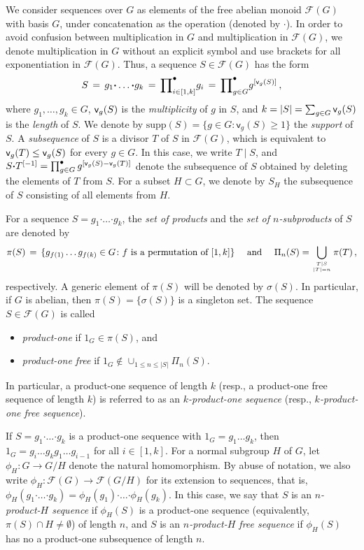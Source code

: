\documentclass[leqno,a4paper]{amsart}
\def\v{{\sf v}}
\def\F{{\mathcal F}}
\def\bd{{\boldsymbol{\cdot}}}
\def\supp{\text{supp}}
\theoremstyle{plain}
\theoremstyle{definition}
\numberwithin{equation}{section}
\begin{document}
	
We  consider sequences over $G$ as elements of the free abelian monoid $\mathcal F (G)$ with basis $G$, under concatenation as the operation (denoted by $\bd$). In order to avoid confusion between multiplication in $G$ and multiplication in $\mathcal F(G)$, we denote multiplication in $G$ without an explicit symbol and  use brackets for all exponentiation in $\mathcal F (G)$.
Thus, a sequence $S \in \F(G)$ has the form
	\[
	  S \, = \, g_1 \bd \ldots \bd g_k \, = \, \small{\prod}^{\bullet}_{i \in [1,k]} g_i \, = \, \small{\prod}^{\bullet}_{g \in G} g^{[\v_g(S)]} \,,
	\]
	where $g_1, \ldots, g_k \in G$, $\v_g(S)$ is the {\em multiplicity} of $g$ in $S$, and $k = |S| = \sum_{g \in G} \v_g(S)$ is the {\em length} of $S$.
    We denote by $\supp (S) = \{ g \in G \colon \mathsf v_g (S) \ge 1 \}$ the {\it support} of $S$.
	A {\em subsequence} of $S$ is a divisor $T$ of $S$ in $\F(G)$, which is equivalent to $\v_g(T) \le \v_g(S)$ for every $g \in G$. In this case, we write $T \mid S$, and $S \bd T^{[-1]} = \prod^{\bullet}_{g \in G} g^{[\v_g(S) - \v_g(T)]}$ denote the subsequence of $S$ obtained by deleting the elements of $T$ from $S$.
	For a subset $H \subset G$, we denote by $S_H$ the subsequence of $S$ consisting of all elements from $H$.
	
	
	For a sequence $S = g_1 \bd \ldots \bd g_k$, the {\em set of products} and the {\em set of $n$-subproducts} of $S$ are denoted by
	\[
	  \pi(S) \, = \, \{  g_{f(1)} \ldots g_{f(k)}  \in G \colon f \text{ is a permutation of }[1,k] \} \quad \text{ and } \quad \Pi_n(S) = \bigcup_{T \mid S \atop |T|=n} \pi(T) \,,
	 \]
	respectively. A generic element of $\pi(S)$ will be denoted by $\sigma(S)$. In particular, if $G$ is abelian, then $\pi (S) = \{ \sigma (S) \}$ is a singleton set. The sequence $S \in \F(G)$ is called
	\begin{itemize}
	\item {\em product-one} if  $1_G \in \pi(S)$, and
	
	\smallskip
	\item {\em product-one free} if $1_G \not\in \cup_{1 \le n \le |S|} \Pi_n(S)$.
	\end{itemize}
	In particular, a product-one sequence of length $k$ (resp., a product-one free sequence of length $k$) is referred to as an {\it $k$-product-one sequence} (resp., {\it $k$-product-one free sequence}).
	
	
	If $S = g_1 \bd \ldots \bd g_k$ is a product-one sequence with $1_G = g_1 \ldots g_k$, then $1_G = g_i \ldots g_k g_1 \ldots g_{i-1}$ for all $i \in [1,k]$.
	For a normal subgroup $H$ of $G$, let $\phi_H \colon G \to G/H$ denote the natural homomorphism. By abuse of notation, we also write $\phi_H \colon \F(G) \to \F(G/H)$ for its extension to sequences, that is, $\phi_H ( g_1 \bd \ldots \bd g_k ) = \phi_H (g_1) \bd \ldots \bd \phi_H (g_k)$.
    In this case, we say that $S$ is an {\em $n$-product-$H$ sequence} if $\phi_H (S)$ is a product-one sequence (equivalently, $\pi(S) \cap H \neq \emptyset$) of length $n$, and $S$ is an {\em $n$-product-$H$ free sequence} if $\phi_H(S)$ has no a product-one subsequence of length $n$.
	
\end{document}
